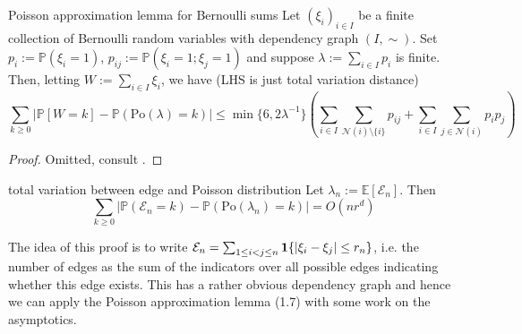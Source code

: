 \documentclass{article}
\newcounter{claimcount} %
\begin{document}
\begin{lemma}[]{Poisson approximation lemma for Bernoulli sums}
    Let $(\xi_i)_{i \in I}$ be a finite collection of Bernoulli random variables with dependency graph $(I, \sim)$. 
    Set $p_i := \mathbb{P}(\xi_i = 1)$, $p_{ij} := \mathbb{P}(\xi_i = 1 ; \xi_j = 1)$ and suppose $\lambda := 
    \sum_{i \in I}p_i$ is finite. Then, letting $W := \sum_{i \in I}\xi_i$, we have (LHS is just total variation distance)
    \[\sum_{k \geq 0} \bigg|\mathbb{P}[W = k] - \mathbb{P}(\text{Po}(\lambda) = k)\bigg| \leq 
    \min \{6, 2\lambda^{-1}\} \left(\sum_{i \in I}\sum_{\mathcal{N}(i) \setminus \{i\}}p_{ij} + 
    \sum_{i \in I}\sum_{j \in \mathcal{N}(i)}p_ip_j\right)\]
\end{lemma}

\begin{proof}
    Omitted, consult \cite{Penrose_2003}.
\end{proof}

\begin{theorem}[]{total variation between edge and Poisson distribution}
    Let $\lambda_n := \mathbb{E}[\mathcal{E}_n]$. Then 
    \[\sum_{k \geq 0} | \mathbb{P}(\mathcal{E}_n = k) - \mathbb{P}(\text{Po}(\lambda_n) = k) | = O(nr^d)\]
\end{theorem}

\setcounter{claimcount}{1} %

The idea of this proof is to write $\mathcal{E}_n = \sum_{1 \leq i < j \leq n} {\bf 1}\{\lvert \xi_i - \xi_j \rvert \leq r_n\}$,
i.e. the number of edges as the sum of the indicators over all possible edges indicating whether this edge 
exists. This has a rather obvious dependency graph and hence we can apply the Poisson approximation lemma (1.7)
with some work on the asymptotics.
\end{document}
